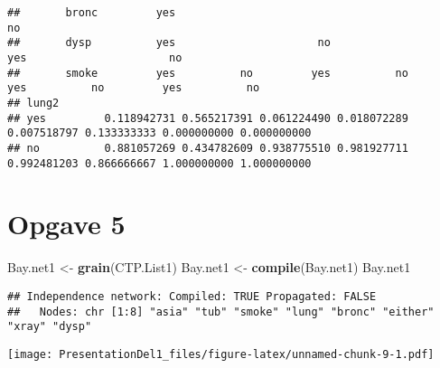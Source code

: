 \documentclass[
]{article}
\newenvironment{Shaded}{\begin{snugshade}}{\end{snugshade}}
\newcommand{\DataTypeTok}[1]{\textcolor[rgb]{0.13,0.29,0.53}{#1}}
\newcommand{\DecValTok}[1]{\textcolor[rgb]{0.00,0.00,0.81}{#1}}
\newcommand{\KeywordTok}[1]{\textcolor[rgb]{0.13,0.29,0.53}{\textbf{#1}}}
\newcommand{\NormalTok}[1]{#1}
\newcommand{\OperatorTok}[1]{\textcolor[rgb]{0.81,0.36,0.00}{\textbf{#1}}}
\newcommand{\StringTok}[1]{\textcolor[rgb]{0.31,0.60,0.02}{#1}}
\begin{document}
\begin{Shaded}
\end{Shaded}

\begin{verbatim}
##       bronc         yes                                              no                                    
##       dysp          yes                      no                     yes                      no            
##       smoke         yes          no         yes          no         yes          no         yes          no
## lung2                                                                                                      
## yes         0.118942731 0.565217391 0.061224490 0.018072289 0.007518797 0.133333333 0.000000000 0.000000000
## no          0.881057269 0.434782609 0.938775510 0.981927711 0.992481203 0.866666667 1.000000000 1.000000000
\end{verbatim}

\hypertarget{opgave-5}{%
\section{Opgave 5}\label{opgave-5}}

\begin{Shaded}
\begin{Highlighting}[]
\NormalTok{Bay.net1 <-}\StringTok{ }\KeywordTok{grain}\NormalTok{(CTP.List1)}
\NormalTok{Bay.net1 <-}\StringTok{ }\KeywordTok{compile}\NormalTok{(Bay.net1)}
\NormalTok{Bay.net1}
\end{Highlighting}
\end{Shaded}

\begin{verbatim}
## Independence network: Compiled: TRUE Propagated: FALSE 
##   Nodes: chr [1:8] "asia" "tub" "smoke" "lung" "bronc" "either" "xray" "dysp"
\end{verbatim}

\begin{Shaded}
\end{Shaded}

\texttt{[image: PresentationDel1\_files/figure-latex/unnamed-chunk-9-1.pdf]}
\end{document}
